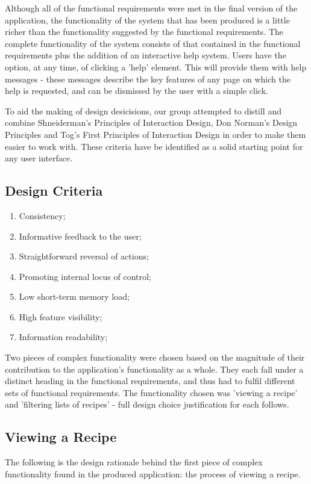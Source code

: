 Although all of the functional requirements were met in the final version of the application, the functionality of the system that has been produced is a little richer than the functionality suggested by the functional requirements. The complete functionality of the system consists of that contained in the functional requirements plus the addition of an interactive help system. Users have the option, at any time, of clicking a 'help' element. This will provide them with help messages - these messages describe the key features of any page on which the help is requested, and can be dismissed by the user with a simple click.

To aid the making of design desicisions, our group attempted to distill and combine Shneiderman's Principles of Interaction Design\cite{Shneiderman86}, Don Norman's Design Principles\cite{InteractionDesign} and Tog's First Principles of Interaction Design\cite{Tog} in order to make them easier to work with. These criteria have be identified as a solid starting point for any user interface.

\subsection*{Design Criteria}
\begin{enumerate}
\item Consistency;
\item Informative feedback to the user;
\item Straightforward reversal of actions;
\item Promoting internal locus of control;
\item Low short-term memory load;
\item High feature visibility;
\item Information readability;
\end{enumerate}

Two pieces of complex functionality were chosen based on the magnitude of their contribution to the application's functionality as a whole. They each fall under a distinct heading in the functional requirements, and thus had to fulfil different sets of functional requirements. The functionality chosen was 'viewing a recipe' and 'filtering lists of recipes' - full design choice justification for each follows.

\subsection{Viewing a Recipe}
The following is the design rationale behind the first piece of complex functionality found in the produced application: the process of viewing a recipe.

